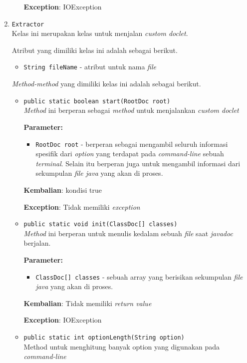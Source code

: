 \documentclass{article}
\begin{document}
\begin{enumerate}
\begin{itemize}
\textbf{Exception}: IOException

\end{itemize}
\item \texttt{Extractor}\\ 
Kelas ini merupakan kelas untuk menjalan \textit{custom doclet}.

Atribut yang dimiliki kelas ini adalah sebagai berikut.
\begin{itemize}
\item \texttt{String fileName} - atribut untuk nama \textit{file}
\end{itemize}
\textit{Method-method} yang dimiliki kelas ini adalah sebagai berikut.
\begin{itemize}
\item \texttt{public static boolean start(RootDoc root)}\\ 
\textit{Method} ini berperan sebagai \textit{method} untuk menjalankan
 \textit{custom doclet}

\textbf{Parameter:}
\begin{itemize}
\item \texttt{RootDoc root} - 
berperan sebagai mengambil seluruh informasi spesifik dari
 \textit{option} yang terdapat pada \textit{command-line} sebuah
 \textit{terminal}. Selain itu berperan juga untuk mengambil informasi dari
 sekumpulan \textit{file java} yang akan di proses.
\end{itemize}
\textbf{Kembalian}: kondisi true

\textbf{Exception}: Tidak memiliki \textit{exception}

\item \texttt{public static void init(ClassDoc[] classes)}\\ 
\textit{Method} ini berperan untuk menulis kedalam sebuah \textit{file}
 saat \textit{javadoc} berjalan.

\textbf{Parameter:}
\begin{itemize}
\item \texttt{ClassDoc[] classes} - 
sebuah array yang berisikan sekumpulan \textit{file java}
 yang akan di proses.
\end{itemize}
\textbf{Kembalian}: Tidak memiliki \textit{return value}

\textbf{Exception}: IOException

\item \texttt{public static int optionLength(String option)}\\ 
Method untuk menghitung banyak option yang digunakan pada \textit{command-line}


\end{itemize}
\end{enumerate}
\end{document}

